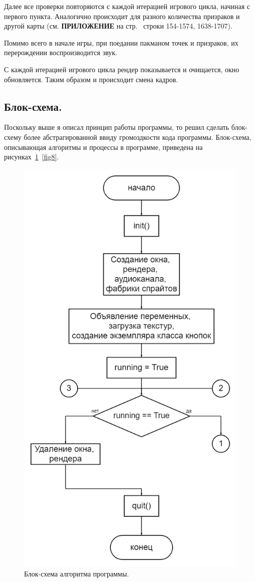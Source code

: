 Далее все проверки повторяются с каждой итерацией игрового цикла, начиная с первого пункта. Аналогично происходит для разного количества призраков и другой карты (см. \textbf{\textsc{ПРИЛОЖЕНИЕ}} на стр.~\pageref{code:main} строки 154-1574, 1638-1707).

Помимо всего в начале игры, при поедании пакманом точек и призраков, их перерождении воспроизводится звук.

С каждой итерацией игрового цикла рендер показывается и очищается, окно обновляется. Таким образом и происходит смена кадров.

\subsection{\label{subsec:ch02/sec01/sub08}Блок-схема.}
Поскольку выше я описал принцип работы программы, то решил сделать блок-схему более абстрагированной ввиду громоздкости кода программы. Блок-схема, описывающая алгоритмы и процессы в программе, приведена на рисунках~\ref{fig7}~\ref{fig8}.
\begin{figure}[H]
	\centering
	\includegraphics[width=0.8\linewidth]{images/flow1.png}
	\caption{Блок-схема алгоритма программы.}
	\label{fig7}
\end{figure}
